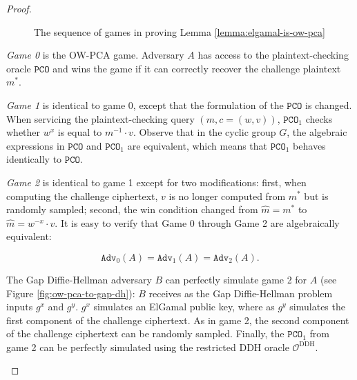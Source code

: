 \documentclass[runningheads]{llncs}
\newcommand{\pco}{\texttt{PCO}}
\newcommand{\adv}{\texttt{Adv}}
\begin{document}
\begin{proof}
\begin{figure}[h]
        \caption{ The sequence of games in proving Lemma \ref{lemma:elgamal-is-ow-pca}}\label{fig:elgamal-pca-games}
    \end{figure}

    \emph{Game 0} is the OW-PCA game. Adversary $A$ has access to the plaintext-checking oracle $\pco$ and wins the game if it can correctly recover the challenge plaintext $m^\ast$.

    \emph{Game 1} is identical to game 0, except that the formulation of the $\pco$ is changed. When servicing the plaintext-checking query $(m, c = (w, v))$, $\pco_1$ checks whether $w^x$ is equal to $m^{-1} \cdot v$. Observe that in the cyclic group $G$, the algebraic expressions in $\pco$ and $\pco_1$ are equivalent, which means that $\pco_1$ behaves identically to $\pco$.

    \emph{Game 2} is identical to game 1 except for two modifications: first, when computing the challenge ciphertext, $v$ is no longer computed from $m^\ast$ but is randomly sampled; second, the win condition changed from $\hat{m} = m^\ast$ to $\hat{m} = w^{-x}\cdot v$. It is easy to verify that Game 0 through Game 2 are algebraically equivalent:

    \begin{equation*}
        \adv_0(A) = \adv_1(A) = \adv_2(A). 
    \end{equation*}

    The Gap Diffie-Hellman adversary $B$ can perfectly simulate game 2 for $A$ (see Figure \ref{fig:ow-pca-to-gap-dh}): $B$ receives as the Gap Diffie-Hellman problem inputs $g^x$ and $g^y$. $g^x$ simulates an ElGamal public key, where as $g^y$ simulates the first component of the challenge ciphertext. As in game 2, the second component of the challenge ciphertext can be randomly sampled. Finally, the $\pco_1$ from game 2 can be perfectly simulated using the restricted DDH oracle $\mathcal{O}^\text{DDH}$.

    \begin{figure}[h]
        \centering


\end{figure}
\end{proof}
\end{document}
